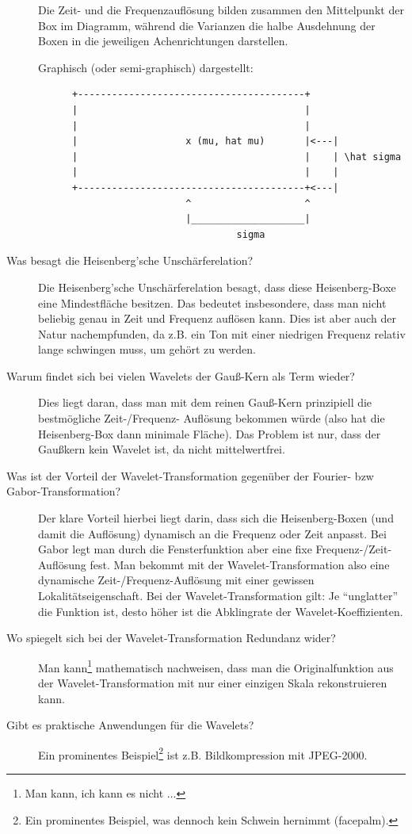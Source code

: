 \begin{description}
    Die Zeit- und die Frequenzauflösung bilden zusammen den Mittelpunkt der Box im Diagramm, während die Varianzen
    die halbe Ausdehnung der Boxen in die jeweiligen Achenrichtungen darstellen.

    Graphisch (oder semi-graphisch) dargestellt:

    \begin{lstlisting}
      +----------------------------------------+
      |                                        |
      |                                        |
      |                   x (mu, hat mu)       |<---|
      |                                        |    | \hat sigma
      |                                        |    |
      +----------------------------------------+<---|
                          ^                    ^
                          |____________________|
                                   sigma
    \end{lstlisting}
  \item[Was besagt die Heisenberg'sche Unschärferelation?]
    Die Heisenberg'sche Unschärferelation besagt, dass diese Heisenberg-Boxe eine Mindestfläche
    besitzen. Das bedeutet insbesondere, dass man nicht beliebig genau in Zeit und Frequenz auflösen
    kann. Dies ist aber auch der Natur nachempfunden, da z.B. ein Ton mit einer niedrigen Frequenz
    relativ lange schwingen muss, um gehört zu werden.
  \item[Warum findet sich bei vielen Wavelets der Gauß-Kern als Term wieder?]
    Dies liegt daran, dass man mit dem reinen Gauß-Kern prinzipiell die bestmögliche Zeit-/Frequenz-
    Auflösung bekommen würde (also hat die Heisenberg-Box dann minimale Fläche). Das Problem ist nur,
    dass der Gaußkern kein Wavelet ist, da nicht mittelwertfrei.
  \item[Was ist der Vorteil der Wavelet-Transformation gegenüber der Fourier- bzw Gabor-Transformation?]
    Der klare Vorteil hierbei liegt darin, dass sich die Heisenberg-Boxen (und damit die Auflösung)
    dynamisch an die Frequenz oder Zeit anpasst. Bei Gabor legt man durch die Fensterfunktion aber eine
    fixe Frequenz-/Zeit-Auflösung fest. Man bekommt mit der Wavelet-Transformation also eine dynamische
    Zeit-/Frequenz-Auflösung mit einer gewissen Lokalitätseigenschaft.
    Bei der Wavelet-Transformation gilt: Je \enquote{unglatter} die Funktion ist, desto höher ist
    die Abklingrate der Wavelet-Koeffizienten.
  \item[Wo spiegelt sich bei der Wavelet-Transformation Redundanz wider?]
    Man kann\footnote{Man kann, ich kann es nicht ...} mathematisch nachweisen, dass man die Originalfunktion
    aus der Wavelet-Transformation mit nur einer einzigen Skala rekonstruieren kann.
  \item[Gibt es praktische Anwendungen für die Wavelets?]
    Ein prominentes Beispiel\footnote{Ein prominentes Beispiel, was dennoch kein Schwein hernimmt (facepalm).}
    ist z.B. Bildkompression mit JPEG-2000.
\end{description}


